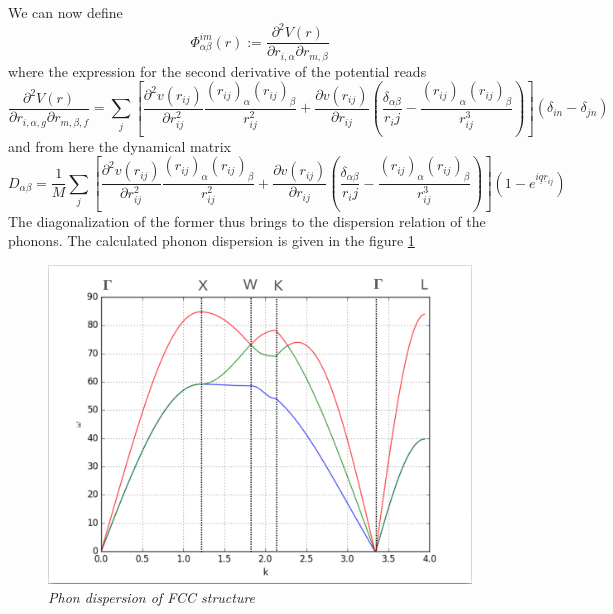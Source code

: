 \documentclass[a4paper]{article}
\begin{document}
        
        We can now define 
        \begin{equation}
            \Phi_{\alpha\beta}^{im}(r):=\frac{\partial^2 V(r)}{\partial r_{i,\alpha}\partial r_{m,\beta}}
        \end{equation}
        where the expression for the second derivative of the potential reads
        \begin{equation*}
            \frac{\partial^2 V(r)}{\partial r_{i,\alpha,g}\partial r_{m,\beta,f}} = \sum_j\left[\frac{\partial^2 v(r_{ij})}{\partial r_{ij}^2}\frac{(r_{ij})_{\alpha}(r_{ij})_{\beta}}{r_{ij}^2} + \frac{\partial v(r_{ij})}{\partial r_{ij}}\left(\frac{\delta_{\alpha\beta}}{r_ij}-\frac{(r_{ij})_{\alpha}(r_{ij})_{\beta}}{r_{ij}^3}\right)\right](\delta_{in}-\delta_{jn})
        \end{equation*}
        and from here the dynamical matrix
        \begin{equation}
            D_{\alpha\beta} = \frac{1}{M}\sum_j\left[\frac{\partial^2 v(r_{ij})}{\partial r_{ij}^2}\frac{(r_{ij})_{\alpha}(r_{ij})_{\beta}}{r_{ij}^2} + \frac{\partial v(r_{ij})}{\partial r_{ij}}\left(\frac{\delta_{\alpha\beta}}{r_ij}-\frac{(r_{ij})_{\alpha}(r_{ij})_{\beta}}{r_{ij}^3}\right)\right]\left(1-e^{i\underline{q}\underline{r}_{ij}}\right)
        \end{equation}
        The diagonalization of the former thus brings to the dispersion relation of the phonons. The calculated phonon dispersion is given in the figure \ref{phonon-fcc}
\begin{figure}[h]
    \centering
    \includegraphics[width=12cm]{phonon_fcc.png}
    \caption{\it \label{phonon-fcc}Phon dispersion of FCC structure}
\end{figure}
%
%
\end{document}

